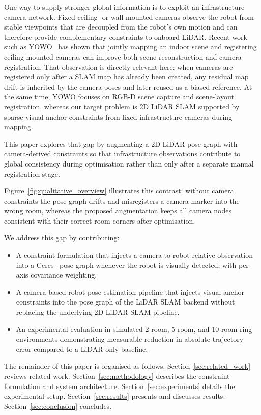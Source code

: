 One way to supply stronger global information is to exploit an infrastructure
camera network. Fixed ceiling- or wall-mounted cameras observe the robot from
stable viewpoints that are decoupled from the robot's own motion and can
therefore provide complementary constraints to onboard LiDAR. Recent work such
as YOWO~\cite{yang2025yowo} has shown that jointly mapping an indoor scene and
registering ceiling-mounted cameras can improve both scene reconstruction and
camera registration. That observation is directly relevant here: when cameras
are registered only after a SLAM map has already been created, any residual map
drift is inherited by the camera poses and later reused as a biased reference.
At the same time, YOWO focuses on RGB-D scene capture and scene-layout
registration, whereas our target problem is 2D LiDAR SLAM supported by
sparse visual anchor constraints from fixed infrastructure cameras during
mapping.

This paper explores that gap by augmenting a 2D LiDAR pose graph with
camera-derived constraints so that infrastructure observations contribute to
global consistency during optimisation rather than only after a separate manual
registration stage.

Figure~\ref{fig:qualitative_overview} illustrates this contrast: without
camera constraints the pose-graph drifts and misregisters a camera marker
into the wrong room, whereas the proposed augmentation keeps all camera nodes
consistent with their correct room corners after optimisation.

We address this gap by contributing:

\begin{itemize}
    \item A constraint formulation that injects a camera-to-robot relative
          observation into a Ceres~\cite{ceres-solver} pose graph whenever the
          robot is visually detected, with per-axis covariance weighting.
    \item A camera-based robot pose estimation pipeline that injects visual
          anchor constraints into the pose graph of the LiDAR SLAM backend
          without replacing the underlying 2D LiDAR SLAM pipeline.
    \item An experimental evaluation in simulated 2-room, 5-room, and 10-room
          ring environments demonstrating measurable reduction in absolute
          trajectory error compared to a LiDAR-only baseline.
\end{itemize}

The remainder of this paper is organised as follows.
Section~\ref{sec:related_work} reviews related work.
Section~\ref{sec:methodology} describes the constraint formulation and
system architecture.
Section~\ref{sec:experiments} details the experimental setup.
Section~\ref{sec:results} presents and discusses results.
Section~\ref{sec:conclusion} concludes.
